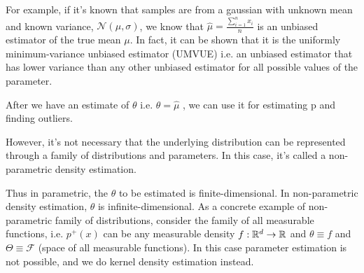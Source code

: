 \documentclass[11pt]{report}
\begin{document}
    For example, if it's known that samples are from a gaussian with unknown mean and known variance, $\mathcal{N}(\mu, \sigma)$, we know that $\hat{\mu}
    = \frac{\sum _{i=1} ^n x_i}{n}$ is an unbiased estimator of the true mean $\mu$. In fact, it can be shown that it is the uniformly minimum-variance unbiased estimator (UMVUE) i.e. an unbiased estimator that has lower variance than any other unbiased estimator for all possible values of the parameter.

    After we have an estimate of $\theta$ i.e. $\hat{\theta} = \hat{\mu}$ , we can use it for estimating p and finding outliers. 

However, it's not necessary that the underlying distribution can be
    represented through a family of distributions and parameters. In this case,
    it's called a non-parametric density estimation. 
    
Thus in parametric, the $\theta$ to be estimated is finite-dimensional. In
non-parametric density estimation, $\theta$ is infinite-dimensional. As a concrete example of
non-parametric family of distributions, consider the family of all measurable
functions, i.e. $p^+(x)$ can be any measurable density $f: \mathbb{R}^d \rightarrow \mathbb{R}$ and
$\theta \equiv f$ and $\Theta \equiv \mathcal{F}$ (space of all measurable
functions). In this case parameter estimation is not possible, and we do kernel
density estimation instead.
\end{document}
